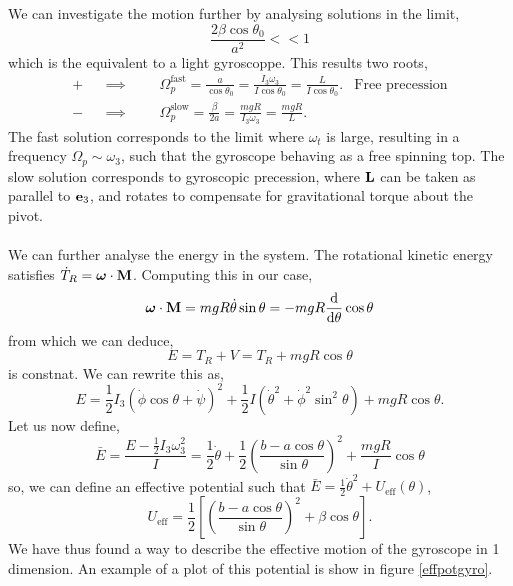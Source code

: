 \documentclass{book}
\begin{document}
We can investigate the motion further by analysing solutions in the limit,
\begin{equation}
	\frac{2\beta \cos\theta_0}{a^2} << 1
\end{equation}
which is the equivalent to a light gyroscoppe. This results two roots,
\begin{align}
	+ && \implies && &\Omega_p^{\text{fast}} = \frac{a}{\cos\theta_0} = \frac{I_3\omega_3}{I\cos\theta_0} = \frac{L}{I\cos\theta_0}. & \text{Free precession} \\
	- && \implies && &\Omega_p^{\text{slow}}=\frac{\beta}{2a} = \frac{mgR}{I_3\omega_3} = \frac{mgR}{L}. &
\end{align}
The fast solution corresponds to the limit where $\omega_t$ is large, resulting in a frequency $\Omega_p \sim \omega_3$, such that the gyroscope behaving as a free spinning top. The slow solution corresponds to gyroscopic precession, where $\vb{L}$ can be taken as parallel to $\vb{e}_3$, and rotates to compensate for gravitational torque about the pivot.
\\\\ 
We can further analyse the energy in the system. The rotational kinetic energy satisfies $\Dot{T}_R = \vb*{\omega}\cdot\vb{M}$. Computing this in our case,
\begin{equation}
	\vb*{\omega}\cdot{\vb{M}} = mgR\Dot{\theta}\sin\theta = -mgR\dv{}{\theta}\cos\theta
\end{equation}
from which we can deduce,
\begin{equation}
	E = T_R + V = T_R + mgR\cos\theta
\end{equation}
is constnat. We can rewrite this as,
\begin{equation}
	E = \frac{1}{2}I_3(\Dot{\phi}\cos\theta + \Dot{\psi})^2 + \frac{1}{2}I(\Dot{\theta}^2 + \Dot{\phi}^2 \sin^2\theta)+ mgR\cos\theta.
\end{equation}
Let us now define,
\begin{equation}
	\bar{E}= \frac{E - \frac{1}{2}I_3\omega_3^2}{I} = \frac{1}{2}\Dot{\theta} + \frac{1}{2}\left(\frac{b-a\cos\theta}{\sin\theta}\right)^2
 + \frac{mgR}{I}\cos\theta
 \end{equation}
so, we can define  an effective potential such that $\bar{E} = \frac{1}{2}\Dot{\theta}^2 + U_{\text{eff}}(\theta)$,
\begin{equation}
	U_{\text{eff}} = \frac{1}{2}\left[\left(\frac{b-a\cos\theta}{\sin\theta}\right)^2 +  \beta\cos\theta \right].
\end{equation}
We have thus found a way to describe the effective motion of the gyroscope in 1 dimension. An example of a plot of this potential is show in figure \ref{effpotgyro}.
\end{document}
